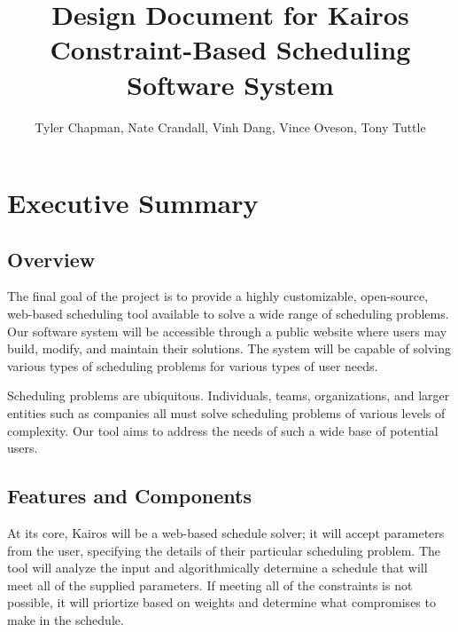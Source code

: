 \documentclass{extarticle}
\begin{document}
\begin{titlepage}
\title{Design Document for Kairos Constraint-Based Scheduling Software System}
\author{Tyler Chapman, Nate Crandall, Vinh Dang, Vince Oveson, Tony Tuttle}
\maketitle
\thispagestyle{empty}
\end{titlepage}

\tableofcontents

\newpage

\section{Executive Summary} %

\subsection{Overview}
The final goal of the project is to provide a highly customizable, open-source, web-based scheduling tool available
to solve a wide range of scheduling problems.  Our software system will be accessible through a public
website where users may build, modify, and maintain their solutions.  The system will be capable of solving various
types of scheduling problems for various types of user needs.

Scheduling problems are ubiquitous.  Individuals, teams, organizations, and larger entities such as companies all
must solve scheduling problems of various levels of complexity.  Our tool aims to address the needs of such a wide
base of potential users.

\subsection{Features and Components}
At its core, Kairos will be a web-based schedule solver; it will accept parameters from the user, specifying the
details of their particular scheduling problem.  The tool will analyze the input and algorithmically determine a
schedule that will meet all of the supplied parameters.  If meeting all of the constraints is not possible, it will
priortize based on weights and determine what compromises to make in the schedule.
\end{document}

